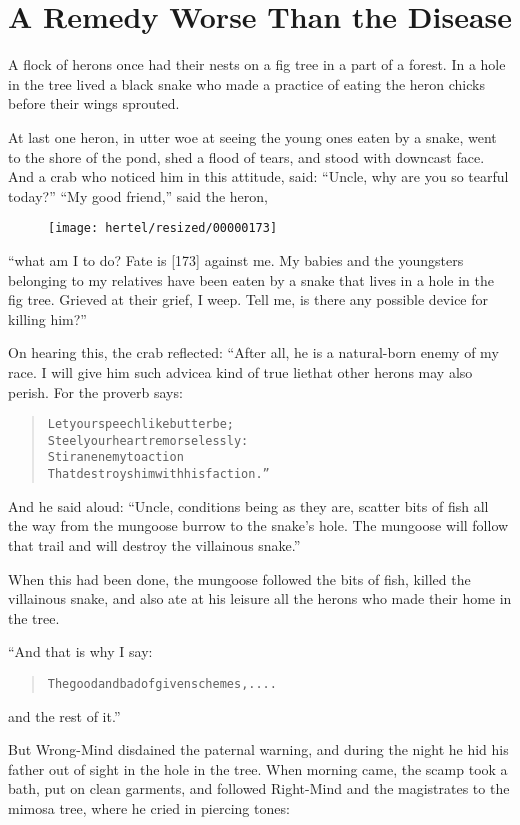 \documentclass[article, twoside, 10pt]{memoir}
\renewenvironment{verbatim}{%
\begin{quote}%
\vskip -10pt%
\begin{alltt}\normalfont\small}{\end{alltt}%
\end{quote}%
\vskip -10pt
} %
\begin{document}
\chapter{A Remedy Worse Than the Disease}

A flock of herons once had their nests on a fig tree in a part of a
forest. In a hole in the tree lived a black snake who made a
practice of eating the heron chicks before their wings sprouted.

At last one heron, in utter woe at seeing the young ones eaten by a
snake, went to the shore of the pond, shed a flood of tears, and
stood with downcast face. And a crab who noticed him in this
attitude, said: ``Uncle, why are you so tearful today?''
``My good friend,'' said the heron,
\begin{figure}[p]\texttt{[image: hertel/resized/00000173]}\end{figure}``what am I to do? Fate is [173] against me. My babies and the youngsters belonging to my relatives have been eaten by a snake that lives in a hole in the fig tree. Grieved at their grief, I weep. Tell me, is there any possible device for killing him?''

On hearing this, the crab reflected: “After all, he is a
natural-born enemy of my race. I will give him such advice{\textemdash}a kind
of true lie{\textemdash}that other herons may also perish. For the proverb
says:

\begin{verbatim}
Let your speech like butter be;
Steel your heart remorselessly:
Stir an enemy to action
That destroys him with his faction.”
\end{verbatim}
And he said aloud:
``Uncle, conditions being as they are, scatter bits of fish all the way from the mungoose burrow to the snake's hole. The mungoose will follow that trail and will destroy the villainous snake.''

When this had been done, the mungoose followed the bits of fish,
killed the villainous snake, and also ate at his leisure all the
herons who made their home in the tree.

“And that is why I say:

\begin{verbatim}
The good and bad of given schemes, ....
\end{verbatim}
and the rest of it.”

But Wrong-Mind disdained the paternal warning, and during the night
he hid his father out of sight in the hole in the tree. When
morning came, the scamp took a bath, put on clean garments, and
followed Right-Mind and the magistrates to the mimosa tree, where
he cried in piercing tones:
\end{document}
